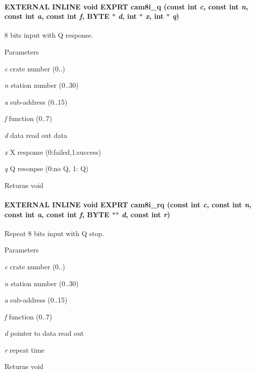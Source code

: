 \paragraph[{cam8i\_\-q}]{\setlength{\rightskip}{0pt plus 5cm}EXTERNAL INLINE void EXPRT cam8i\_\-q (const int {\em c}, \/  const int {\em n}, \/  const int {\em a}, \/  const int {\em f}, \/  {\bf BYTE} $\ast$ {\em d}, \/  int $\ast$ {\em x}, \/  int $\ast$ {\em q})}\hfill\label{group__mcstdfunctionh_gad21ad710943e2ab5df6f8e609afeebfe}
8 bits input with Q response. 
\begin{DoxyParams}{Parameters}
\item[{\em c}]crate number (0..) \item[{\em n}]station number (0..30) \item[{\em a}]sub-\/address (0..15) \item[{\em f}]function (0..7) \item[{\em d}]data read out data \item[{\em x}]X response (0:failed,1:success) \item[{\em q}]Q resonpse (0:no Q, 1: Q) \end{DoxyParams}
\begin{DoxyReturn}{Returns}
void 
\end{DoxyReturn}
\paragraph[{cam8i\_\-rq}]{\setlength{\rightskip}{0pt plus 5cm}EXTERNAL INLINE void EXPRT cam8i\_\-rq (const int {\em c}, \/  const int {\em n}, \/  const int {\em a}, \/  const int {\em f}, \/  {\bf BYTE} $\ast$$\ast$ {\em d}, \/  const int {\em r})}\hfill\label{group__mcstdfunctionh_ga0b43ea9b407515f2cd75fb68f0d07e39}
Repeat 8 bits input with Q stop. 
\begin{DoxyParams}{Parameters}
\item[{\em c}]crate number (0..) \item[{\em n}]station number (0..30) \item[{\em a}]sub-\/address (0..15) \item[{\em f}]function (0..7) \item[{\em d}]pointer to data read out \item[{\em r}]repeat time \end{DoxyParams}
\begin{DoxyReturn}{Returns}
void 
\end{DoxyReturn}
